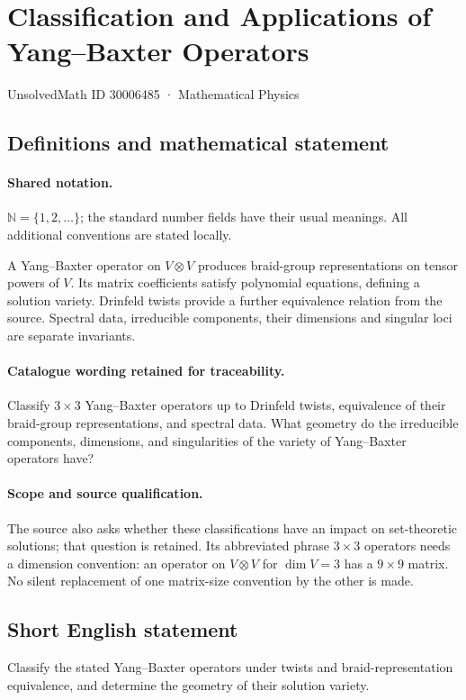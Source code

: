 \documentclass[11pt]{article}
\begin{document}
\setcounter{section}{30006484}
\section{Classification and Applications of Yang–Baxter Operators}\label{30006485}
{\small UnsolvedMath ID 30006485 · Mathematical Physics}
\subsection{Definitions and mathematical statement}

\paragraph{Shared notation.}$\mathbb N=\{1,2,\ldots\}$; the standard number fields have their usual meanings. All additional conventions are stated locally.


A Yang--Baxter operator on $V\otimes V$ produces braid-group representations on tensor powers of $V$. Its matrix coefficients satisfy polynomial equations, defining a solution variety. Drinfeld twists provide a further equivalence relation from the source. Spectral data, irreducible components, their dimensions and singular loci are separate invariants.

\paragraph{Catalogue wording retained for traceability.}
Classify $3\times3$ Yang–Baxter operators up to Drinfeld twists, equivalence of their braid-group representations, and spectral data. What geometry do the irreducible components, dimensions, and singularities of the variety of Yang–Baxter operators have?

\paragraph{Scope and source qualification.}The source also asks whether these classifications have an impact on set-theoretic solutions; that question is retained. Its abbreviated phrase $3\times3$ operators needs a dimension convention: an operator on $V\otimes V$ for $\dim V=3$ has a $9\times9$ matrix. No silent replacement of one matrix-size convention by the other is made.
\subsection{Short English statement}
Classify the stated Yang--Baxter operators under twists and braid-representation equivalence, and determine the geometry of their solution variety.
\end{document}
